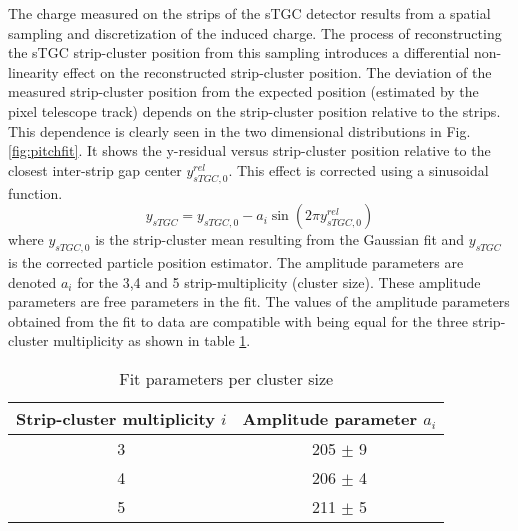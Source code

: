 	The charge measured on the strips of the sTGC detector results from a spatial sampling and discretization of the induced
	charge. The process of reconstructing the sTGC strip-cluster position from this sampling introduces a differential
	non-linearity effect on the reconstructed strip-cluster position. The deviation of the measured strip-cluster position
	from the expected position (estimated by the pixel telescope track) depends on the strip-cluster position relative to
	the strips.
	This dependence is clearly seen in the two dimensional distributions in Fig.\ref{fig:pitchfit}. It shows the y-residual versus
	strip-cluster position relative to the closest inter-strip gap center $y_{sTGC,0}^{rel}$. This effect is corrected using
	a sinusoidal function.
	\begin{equation}
	 y_{sTGC} = y_{sTGC,0}-a_i\sin \left(2\pi y_{sTGC,0}^{rel}\right)
	\end{equation}
	where $y_{sTGC,0}$ is the strip-cluster mean resulting from the Gaussian fit and $y_{sTGC}$ is the corrected particle
	position estimator. The amplitude parameters are denoted $a_i$ for the 3,4 and 5 strip-multiplicity (cluster size). These
	amplitude parameters are free parameters in the fit. The values of the amplitude parameters obtained from the fit to
	data are compatible with being equal for the three strip-cluster multiplicity as shown in table \ref{table}.\par

	\begin{table}
		\centering
		\caption{Fit parameters per cluster size}\label{table}
		\begin{tabular}{cc}
		\hline
		Strip-cluster multiplicity $i$ & Amplitude parameter $a_i$\\
		\hline
		3 & 205 $\pm$ 9\\
		4 & 206 $\pm$ 4\\
		5 & 211 $\pm$ 5\\
		\hline
		\end{tabular}
	\end{table}

